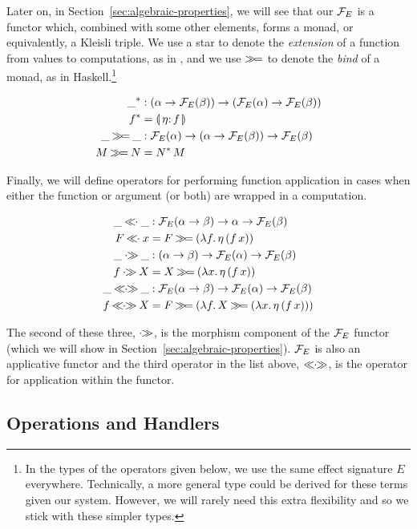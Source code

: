 Later on, in Section~\ref{sec:algebraic-properties}, we will see that our
$\mathcal{F}_E$ is a functor which, combined with some other elements, forms a
monad, or equivalently, a Kleisli triple. We use a star to denote the
\emph{extension} of a function from values to computations, as in
\cite{moggi1991notions}, and we use $\mathbin{\gg\!=}$ to denote the \emph{bind} of
a monad, as in Haskell.\footnote{In the types of the operators given below,
  we use the same effect signature $E$ everywhere. Technically, a more
  general type could be derived for these terms given our system. However,
  we will rarely need this extra flexibility and so we stick with these
  simpler types.}

\begin{align*}
  \_^* &: (\alpha \to \FF_E(\beta)) \to (\FF_E(\alpha) \to \FF_E(\beta)) \\
  f^* &= \banana{\onto{\eta} f} \\
  \_ \hsbind \_ &: \FF_E(\alpha) \to (\alpha \to \FF_E(\beta)) \to \FF_E(\beta) \\
  M \hsbind N &= \ap{N^*}{M} \\
\end{align*}

Finally, we will define operators for performing function application in
cases when either the function or argument (or both) are wrapped in a
computation.

\begin{align*}
  \_ \apl \_ &: \FF_E(\alpha \to \beta) \to \alpha \to \FF_E(\beta) \\
  F \apl x &= F \hsbind (\lam{f}{\ap{\eta}{(\ap{f}{x})}}) \\
  \_ \apr \_ &: (\alpha \to \beta) \to \FF_E(\alpha) \to \FF_E(\beta) \\
  f \apr X &= X \hsbind (\lam{x}{\ap{\eta}{(\ap{f}{x})}}) \\
  \_ \aplr \_ &: \FF_E(\alpha \to \beta) \to \FF_E(\alpha) \to \FF_E(\beta) \\
  f \aplr X &= F \hsbind (\lam{f}{X \hsbind (\lam{x}{\ap{\eta}{(\ap{f}{x})}})}) \\
\end{align*}

The second of these three, $\mathbin{\cdot\!\!\gg}$, is the morphism component of the $\mathcal{F}_E$
functor (which we will show in
Section~\ref{sec:algebraic-properties}). $\mathcal{F}_E$ is also an applicative
functor and the third operator in the list above, $\mathbin{\ll\!\!\cdot\!\!\gg}$, is the operator
for application within the functor.

\subsection{Operations and Handlers}
\label{ssec:operations-and-handlers}

